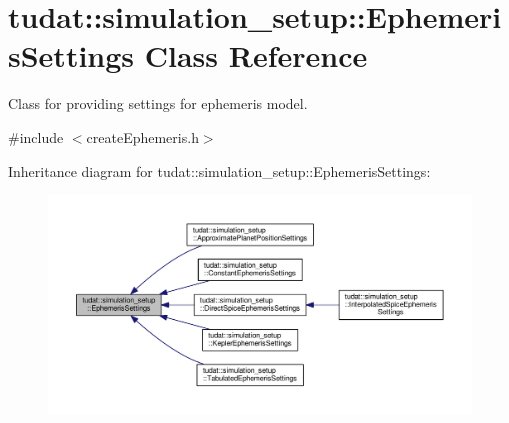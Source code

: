 \hypertarget{classtudat_1_1simulation__setup_1_1EphemerisSettings}{}\section{tudat\+:\+:simulation\+\_\+setup\+:\+:Ephemeris\+Settings Class Reference}
\label{classtudat_1_1simulation__setup_1_1EphemerisSettings}


Class for providing settings for ephemeris model.  




{\ttfamily \#include $<$create\+Ephemeris.\+h$>$}



Inheritance diagram for tudat\+:\+:simulation\+\_\+setup\+:\+:Ephemeris\+Settings\+:
\nopagebreak
\begin{figure}[H]
\begin{center}
\leavevmode
\includegraphics[width=350pt]{classtudat_1_1simulation__setup_1_1EphemerisSettings__inherit__graph}
\end{center}
\end{figure}
